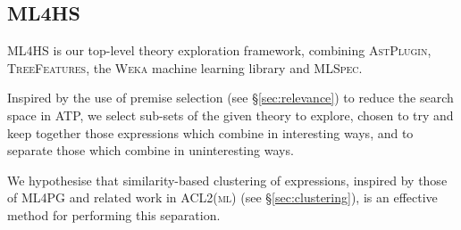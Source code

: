 \subsection{\textsc{ML4HS}}
\label{sec:ml4hs}

\textsc{ML4HS} is our top-level theory exploration framework, combining \textsc{AstPlugin}, \textsc{TreeFeatures}, the \textsc{Weka} machine learning library and \textsc{MLSpec}.

Inspired by the use of premise selection (see \S \ref{sec:relevance}) to reduce the search space in ATP,
we select sub-sets of the given theory to explore, chosen to try and keep together those expressions which combine in interesting ways, and to separate those which combine in uninteresting ways.

We hypothesise that similarity-based clustering of expressions, inspired by those of \textsc{ML4PG}  and related work in \textsc{ACL2(ml)} (see \S \ref{sec:clustering}), is an effective method for performing this separation.



